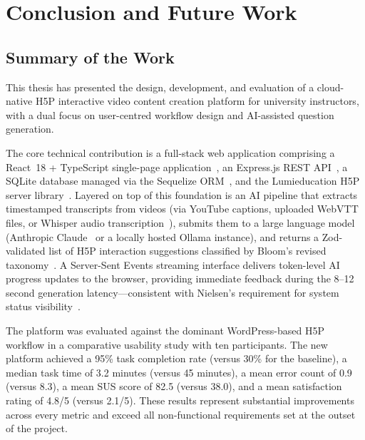 \chapter{Conclusion and Future Work}

\section{Summary of the Work}

This thesis has presented the design, development, and evaluation of a
cloud-native H5P interactive video content creation platform for university
instructors, with a dual focus on user-centred workflow design and
AI-assisted question generation.

The core technical contribution is a full-stack web application comprising
a React~18 + TypeScript single-page application~\cite{react2023,typescript2023},
an Express.js REST API~\cite{expressjs2023}, a SQLite database managed via the
Sequelize ORM~\cite{sqlite2023,sequelize2023}, and the Lumieducation H5P
server library~\cite{lumieducation2023}. Layered on top of this foundation
is an AI pipeline that extracts timestamped transcripts from videos (via
YouTube captions, uploaded WebVTT files, or Whisper audio
transcription~\cite{radford2023}), submits them to a large language model
(Anthropic Claude~\cite{anthropic2024} or a locally hosted Ollama instance),
and returns a Zod-validated list of H5P interaction suggestions classified
by Bloom's revised taxonomy~\cite{anderson2001}. A Server-Sent Events
streaming interface delivers token-level AI progress updates to the browser,
providing immediate feedback during the 8--12 second generation
latency---consistent with Nielsen's requirement for system status
visibility~\cite{nielsen1994}.

The platform was evaluated against the dominant WordPress-based H5P workflow
in a comparative usability study with ten participants. The new platform
achieved a 95\% task completion rate (versus 30\% for the baseline), a median
task time of 3.2 minutes (versus 45 minutes), a mean error count of 0.9
(versus 8.3), a mean SUS score of 82.5 (versus 38.0), and a mean
satisfaction rating of 4.8/5 (versus 2.1/5). These results represent
substantial improvements across every metric and exceed all non-functional
requirements set at the outset of the project.

